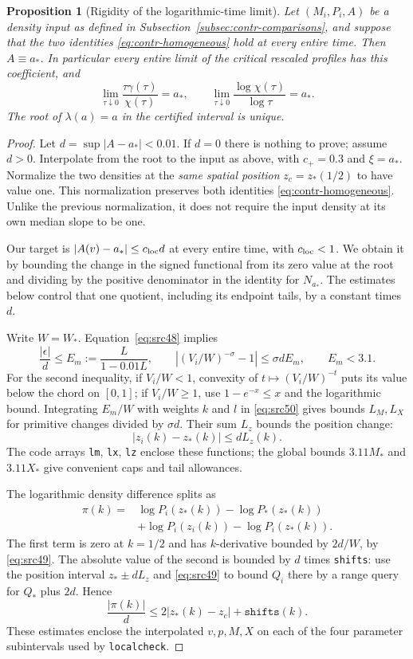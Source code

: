 \documentclass[11pt,a4paper]{article}
\numberwithin{equation}{section}
\newtheorem{proposition}[theorem]{Proposition}
\theoremstyle{definition}
\theoremstyle{remark}
\begin{document}
\begin{proposition}[Rigidity of the logarithmic-time limit]
\label{prop:contr-rigidity}
Let $(M_i,P_i,A)$ be a density input as defined in
Subsection~\ref{subsec:contr-comparisons}, and suppose that the two
identities \eqref{eq:contr-homogeneous} hold at every entire time.
Then $A\equiv a_*$.  In particular every entire limit of the critical
rescaled profiles has this coefficient, and
\[
 \lim_{\tau\downarrow0}\frac{\tau\gamma(\tau)}{\chi(\tau)}=a_*,
 \qquad
 \lim_{\tau\downarrow0}\frac{\log\chi(\tau)}{\log\tau}=a_*.
\]
The root of $\lambda(a)=a$ in the certified interval is unique.
\end{proposition}

\begin{proof}
Let $d=\sup|A-a_*|<0.01$.  If $d=0$ there is nothing to prove;
assume $d>0$.  Interpolate from the root to the input as above, with
$c_+=0.3$ and $\xi=a_*$.  Normalize the two densities at the \emph{same
spatial position} $z_c=z_*(1/2)$ to have value one.  This normalization
preserves both identities \eqref{eq:contr-homogeneous}.  Unlike the previous normalization,
it does not require the input density at its own median slope to be
one.

Our target is $|A(v)-a_*|\le c_{\rm loc}d$ at every entire time, with
$c_{\rm loc}<1$.  We obtain it by bounding the change in the signed
functional from its zero value at the root and dividing by the positive
denominator in the identity for $N_{a_*}$.  The estimates below control
that one quotient, including its endpoint tails, by a constant times $d$.

Write $W=W_*$.  Equation~\eqref{eq:src48} implies
\[
 \frac{|\epsilon|}{d}\le E_m:=\frac{L}{1-0.01L},\qquad
 |(V_i/W)^{-\sigma}-1|\le\sigma dE_m,
 \qquad E_m<3.1.
\]
For the second inequality, if $V_i/W<1$, convexity of
$t\mapsto(V_i/W)^{-t}$ puts its value below the chord on $[0,1]$;
if $V_i/W\ge1$, use $1-e^{-x}\le x$ and the logarithmic bound.
Integrating $E_m/W$ with weights $k$ and $l$ in
\eqref{eq:src50} gives bounds $L_M,L_X$ for primitive changes
divided by $\sigma d$.  Their sum $L_z$ bounds the position change:
\[
 |z_i(k)-z_*(k)|\le dL_z(k).
\]
The code arrays \texttt{lm}, \texttt{lx}, \texttt{lz} enclose these
functions; the global bounds $3.11M_*$ and $3.11X_*$ give convenient
caps and tail allowances.

The logarithmic density difference splits as
\[
 \begin{split}
 \pi(k)={}&\log P_i(z_*(k))-\log P_*(z_*(k))\\
 &+\log P_i(z_i(k))-\log P_i(z_*(k)).
 \end{split}
\]
The first term is zero at $k=1/2$ and has $k$-derivative bounded by
$2d/W$, by \eqref{eq:src49}.  The absolute value of the second is
bounded by $d$ times \texttt{shifts}: use the position interval
$z_*\pm dL_z$ and \eqref{eq:src49} to bound $Q_i$ there by a range
query for $Q_*$ plus $2d$.  Hence
\[
 \frac{|\pi(k)|}{d}\le2|z_*(k)-z_c|+\texttt{shifts}(k).
\]
These estimates enclose the interpolated $v,p,M,X$ on each of the
four parameter subintervals used by \texttt{localcheck}.


\end{proof}
\end{document}
